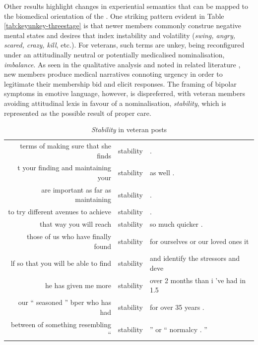 Other results highlight changes in experiential semantics that can be mapped to the biomedical orientation of the . One striking pattern evident in Table \ref{tab:keyunkey-threestage} is that newer \glspl{member} commonly construe negative mental states and desires that index instability and volatility (\emph{swing, angry, scared, crazy, kill}, etc.). For veterans, such terms are unkey, being reconfigured under an attitudinally neutral or potentially medicalised nominalisation, \emph{imbalance}. As seen in the qualitative analysis and noted in related literature \cite[e.g.][]{horne_doing_2009}, new \glspl{member} produce medical narratives connoting urgency in order to legitimate their membership bid and elicit responses. The framing of bipolar symptoms in emotive language, however, is dispreferred, with veteran \glspl{member} avoiding attitudinal lexis in favour of a nominalisation, \emph{stability}, which is represented as the possible result of proper care.

\begin{table}[htb]
\centering
\begin{tabular}{rll}
\toprule
terms of making sure that she finds &  stability   &  .                                   \\
t your finding and maintaining your &  stability   &  as well .                           \\
are important as far as maintaining &  stability   &  .                                   \\
to try different avenues to achieve &  stability   &  .                                   \\
            that way you will reach &  stability   &  so much quicker .                   \\
 those of us who have finally found &  stability   &  for ourselves or our loved ones it  \\
lf so that you will be able to find &  stability   &  and identify the stressors and deve \\
               he has given me more &  stability   &  over 2 months than i 've had in 1.5 \\
our `` seasoned '' bper who has had &  stability   &  for over 35 years .                 \\
 between of something resembling `` &  stability   &  '' or `` normalcy . ''              \\

\bottomrule
\end{tabular}
\caption{\emph{Stability} in veteran posts}
\label{conc:stability}
\end{table}

